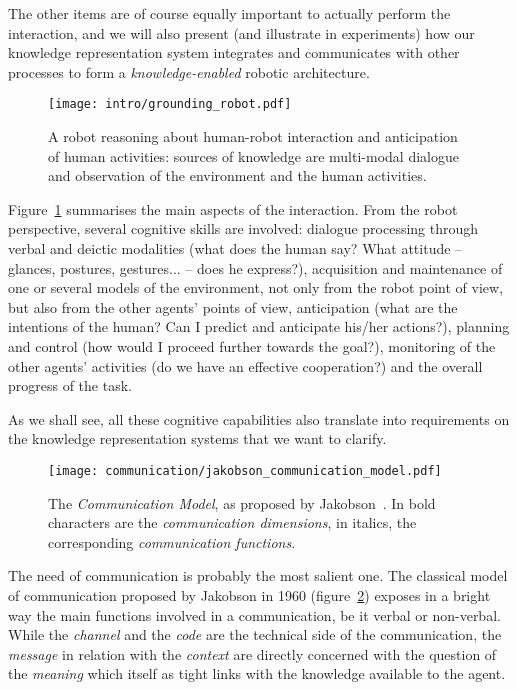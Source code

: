 The other items are of course equally important to actually perform the
interaction, and we will also present (and illustrate in experiments) how our
knowledge representation system integrates and communicates with other
processes to form a \emph{knowledge-enabled} robotic architecture.


\begin{figure}
    \centering
    \texttt{[image: intro/grounding\_robot.pdf]}
    \caption{A robot reasoning about human-robot interaction and anticipation
    of human activities: sources of knowledge are multi-modal dialogue and
    observation of the environment and the human activities.}
    \label{fig|hri-dec}
\end{figure}


Figure~\ref{fig|hri-dec} summarises the main aspects of the interaction.
From the robot perspective, several cognitive skills are involved: dialogue
processing through verbal and deictic modalities (what does the human say? What
attitude -- glances, postures, gestures... -- does he express?), acquisition
and maintenance of one or several models of the environment, not only from the
robot point of view, but also from the other agents' points of view,
anticipation (what are the intentions of the human? Can I predict and
anticipate his/her actions?), planning and control (how would I proceed further
towards the goal?), monitoring of the other agents' activities (do we have an
effective cooperation?) and the overall progress of the task. 

As we shall see, all these cognitive capabilities also translate into
requirements on the knowledge representation systems that we want to clarify.

\begin{figure}%
\centering
  \texttt{[image: communication/jakobson\_communication\_model.pdf]}

  \caption{The \emph{Communication Model}, as proposed by
  Jakobson~\cite{Jakobson1960}. In bold characters are the \emph{communication
  dimensions}, in italics, the corresponding \emph{communication functions}.}
  
  \label{fig|jakobson_communication_model}
\end{figure}


The need of communication is probably the most salient one. The classical model
of communication proposed by Jakobson in 1960
(figure~\ref{fig|jakobson_communication_model}) exposes in a bright way the
main functions involved in a communication, be it verbal or non-verbal. While
the \emph{channel} and the \emph{code} are the technical side of the
communication, the \emph{message} in relation with the \emph{context} are
directly concerned with the question of the \emph{meaning} which itself as
tight links with the knowledge available to the agent.


